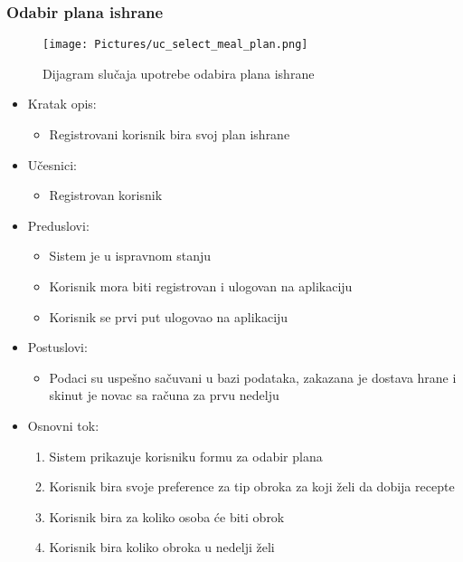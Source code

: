\subsubsection{Odabir plana ishrane}

\begin{figure}[H]
\begin{center}
\texttt{[image: Pictures/uc\_select\_meal\_plan.png]}
\end{center}
    \caption{Dijagram slučaja upotrebe odabira plana ishrane}
\label{fig:UCSelectMealPlan}
\end{figure}

\begin{itemize}
    \item Kratak opis:
        \begin{itemize}
            \item Registrovani korisnik bira svoj plan ishrane 
        \end{itemize}
    \item Učesnici:
        \begin{itemize}
            \item Registrovan korisnik
        \end{itemize}
    \item Preduslovi:
        \begin{itemize}
            \item Sistem je u ispravnom stanju
            \item Korisnik mora biti registrovan i ulogovan na aplikaciju
            \item Korisnik se prvi put ulogovao na aplikaciju
        \end{itemize}
    \item Postuslovi:
        \begin{itemize}
            \item Podaci su uspešno sačuvani u bazi podataka, zakazana je dostava hrane i skinut je novac sa računa za prvu nedelju
        \end{itemize}
    \item Osnovni tok:
        \begin{enumerate}
            \item Sistem prikazuje korisniku formu za odabir plana
            \item Korisnik bira svoje preference za tip obroka za koji želi da dobija recepte
            \item Korisnik bira za koliko osoba će biti obrok
            \item Korisnik bira koliko obroka u nedelji želi

\end{enumerate}
\end{itemize}
